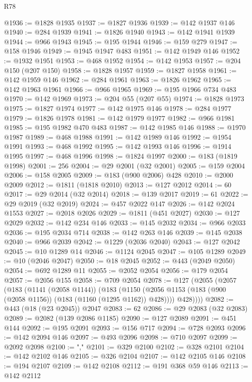 \begin{lexlean}{R78}
\begin{coremodule}
@1936 := @1828 @1935
@1937 := @1827 @1936
@1939 := @142 @1937 @146
@1940 := @284 @1939
@1941 := @1826 @1940
@1943 := @142 @1941 @1939
@1944 := @966 @1943
@1945 := @195 @1944
@1946 := @159 @279
@1947 := @158 @1946
@1949 := @1945 @1947 @483
@1951 := @142 @1949 @146
@1952 := @1932 @1951
@1953 := @468 @1952
@1954 := @142 @1953
@1957 := @204 @150 (@207 @150)
@1958 := @1828 @1957
@1959 := @1827 @1958
@1961 := @142 @1959 @146
@1962 := @284 @1961
@1963 := @1826 @1962
@1965 := @142 @1963 @1961
@1966 := @966 @1965
@1969 := @195 @1966 @734 @483
@1970 := @142 @1969
@1973 := @204 @55 (@207 @55)
@1974 := @1828 @1973
@1975 := @1827 @1974
@1977 := @142 @1975 @146
@1978 := @284 @1977
@1979 := @1826 @1978
@1981 := @142 @1979 @1977
@1982 := @966 @1981
@1985 := @195 @1982 @470 @483
@1987 := @142 @1985 @146
@1988 := @1970 @1987
@1989 := @468 @1988
@1991 := @142 @1989 @146
@1992 := @1954 @1991
@1993 := @468 @1992
@1995 := @142 @1993 @146
@1996 := @1914 @1995
@1997 := @468 @1996
@1998 := @1824 @1997
@2000 := @183 (@1819 @1998)
@2001 := 256
@2004 := @29 @2001 (@32 @2001)
@2005 := @159 @2004
@2006 := @158 @2005
@2009 := @183 (@900 @2006) @428
@2010 := @2000 @2009
@2012 := @1811 (@1818 @2010)
@2013 := @127 @2012
@2014 := 60
@2017 := @29 @2014 (@32 @2014)
@2018 := @139 @2017
@2019 := 61
@2022 := @29 @2019 (@32 @2019)
@2024 := @457 @2022 @147
@2026 := @142 @2024 @1553
@2027 := @2018 @2026
@2029 := @1811 (@451 @2027)
@2030 := @127 @2029
@2032 := @142 @234 @146
@2033 := @145 @2032
@2034 := @966 @2033
@2036 := @195 @2034 @714
@2038 := @142 @263 @146
@2039 := @145 @2038
@2040 := @966 @2039
@2042 := @1229 (@2036 @2040)
@2043 := @127 @2042
@2045 := @10 @1289 @14
@2046 := @1124 @2045
@2047 := @105 @1289
@2049 := @10 (@2046 @2047)
@2050 := @18 @2045
@2052 := @443 (@2049 @2050)
@2054 := @692 @1289 @11
@2055 := @2052 @2054
@2056 := @179 @2054
@2057 := @2056 @155
@2058 := @709 @2054
@2078 := @127
    (@2055
      (@2057
        (@183
          (@1141 (@2058 @1144))
          (@183
            (@1150 (@2056 @1153 (@183 (@900 (@2058 @1156)) (@183 (@1160 (@1295 @1162)) @428))))
            @428))))
@2082 := @443 (@18 (@23 @2045)) @2047
@2083 := 62
@2086 := @29 @2083 (@32 @2083)
@2089 := @2082 (@139 @2086 @1185)
@2090 := @127 @2089
@2091 := @451 @144
@2092 := @195 @2091
@2093 := @156 @717
@2094 := @728 @2093
@2096 := @142 @2094 @146
@2097 := @493 @2096
@2098 := @710 @2097
@2099 := @2092 @2098
@2100 := ","
@2101 := @329 @2100
@2102 := @328 @2101
@2104 := @142 @2102 @146
@2105 := @326 @2104
@2107 := @142 @2105 @146
@2108 := @194 @2107
@2109 := @142 @2108
@2112 := @191 @368 @59 @146
@2113 := @142 @2112

\end{coremodule}
\end{lexlean}
